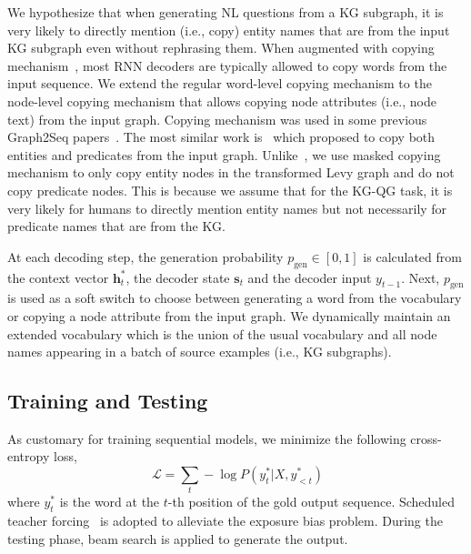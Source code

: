 \documentclass[journal]{IEEEtran}
\let\vec\mathbf
\begin{document}
We hypothesize that when generating NL questions from a KG subgraph, it is very likely to directly mention (i.e., copy) entity names that are from the input KG subgraph even without rephrasing them.
When augmented with copying mechanism~\cite{vinyals2015pointer,gu2016incorporating}, most RNN decoders are typically allowed to copy words from the input sequence.
We extend the regular word-level copying mechanism to the node-level copying mechanism that
allows copying node attributes (i.e., node text) from the input graph.
Copying mechanism was used in some previous Graph2Seq papers~\cite{marcheggiani2018deep,koncel2019text}. The most similar work is~\cite{koncel2019text} which proposed to copy both entities and predicates from the input graph. Unlike~\cite{koncel2019text}, we use masked copying mechanism to only copy entity nodes in the transformed Levy graph and do not copy predicate nodes. This is because we assume that for the KG-QG task, it is very likely for humans to directly mention entity names but not necessarily for predicate names that are from the KG. 




At each decoding step,
the generation probability $p_\text{gen} \in [0, 1]$ is calculated from the context vector $\vec{h}^*_t$, the decoder state $\vec{s}_t$ and the decoder input $y_{t-1}$.
Next, $p_\text{gen}$ is used as a soft switch to choose between generating a word from the vocabulary or copying a node attribute from the input graph.
We dynamically maintain an extended vocabulary which is the union of the usual vocabulary and all node names appearing in a batch of source examples (i.e., KG subgraphs).




\subsection{Training and Testing}
As customary for training sequential models,
we minimize the following cross-entropy loss,
\vspace{-1mm}
\begin{equation}~\label{eq:cross_entropy_loss}
\mathcal{L} = \sum_{t}{}-\log{} P(y_t^*|X, y^*_{<t})
\end{equation}
\vspace{-1mm}
where $y_t^*$ is the word at the $t$-th position of the gold output sequence.
Scheduled teacher forcing~\cite{bengio2015scheduled} is adopted to alleviate the exposure bias problem.
During the testing phase, beam search is applied to generate the output.
\end{document}

